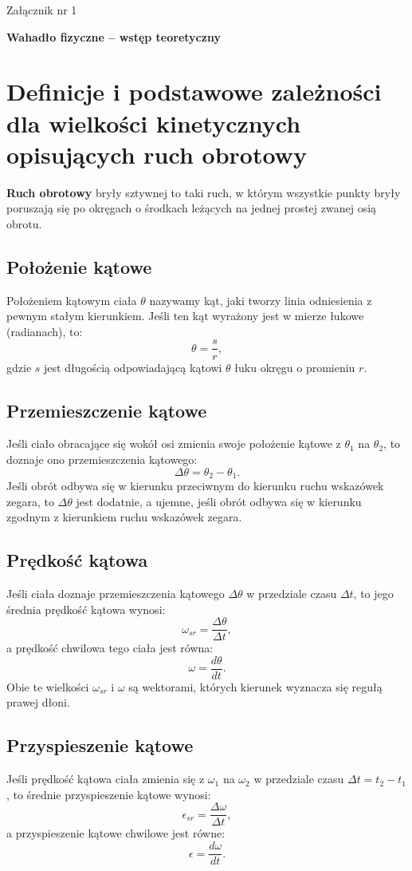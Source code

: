 \documentclass[a4paper,11pt]{article}
\begin{document}
\begin{flushright}
Załącznik nr 1
\end{flushright}

\begin{center}
\begin{LARGE}
\textbf{Wahadło fizyczne -- wstęp teoretyczny}
\end{LARGE}
\end{center}

\section{Definicje i podstawowe zależności dla wielkości kinetycznych opisujących ruch obrotowy}
\textbf{Ruch obrotowy} bryły sztywnej to taki ruch, w którym wszystkie punkty bryły poruszają się po okręgach o środkach leżących na jednej prostej zwanej osią obrotu.  
\subsection{Położenie kątowe}
Położeniem kątowym ciała $\theta$ nazywamy kąt, jaki tworzy linia odniesienia z pewnym stałym kierunkiem. Jeśli ten kąt wyrażony jest w mierze łukowe (radianach), to:
$$\theta = \frac{s}{r},$$
gdzie $s$ jest długością odpowiadającą kątowi $\theta$ łuku okręgu o promieniu $r$. 
\subsection{Przemieszczenie kątowe}
Jeśli ciało obracające się wokół osi zmienia swoje położenie kątowe z $\theta_{1}$ na $\theta_{2}$, to doznaje ono przemieszczenia kątowego:
$$\Delta \theta = \theta_{2} - \theta_{1}.$$
Jeśli obrót odbywa się w kierunku przeciwnym do kierunku ruchu wskazówek zegara, to $\Delta \theta$ jest dodatnie, a ujemne, jeśli obrót odbywa się w kierunku zgodnym z kierunkiem ruchu wskazówek zegara.
\subsection{Prędkość kątowa}
Jeśli ciała doznaje przemieszczenia kątowego $\Delta \theta$ w przedziale czasu  $\Delta t$, to jego średnia prędkość kątowa wynosi:
$$\omega_{sr} = \dfrac{\Delta \theta}{\Delta t},$$
a prędkość chwilowa tego ciała jest równa:
$$\omega = \dfrac{d\theta}{dt}.$$
Obie te wielkości $\omega_{sr}$ i $\omega$ są wektorami, których kierunek wyznacza się regułą prawej dłoni.
\subsection{Przyspieszenie kątowe}
Jeśli prędkość kątowa ciała zmienia się z $\omega_{1}$ na $\omega_{2}$ w przedziale czasu $\Delta t = t_{2} - t_{1}$, to średnie przyspieszenie kątowe wynosi:
$$\epsilon_{sr} = \dfrac{\Delta \omega}{\Delta t},$$
a przyspieszenie kątowe chwilowe jest równe:
$$\epsilon = \dfrac{d\omega}{dt}.$$
\end{document}
